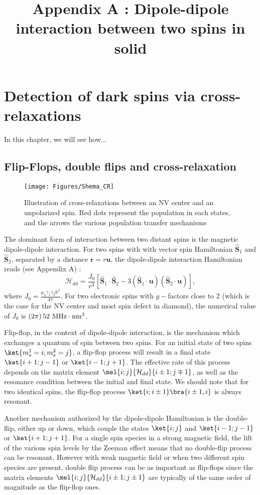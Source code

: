 \documentclass[a4paper]{report}
\title{Appendix A : Dipole-dipole interaction between two spins in solid}
\begin{document}
\chapter{Detection of dark spins via cross-relaxations}
In this chapter, we will see how...
\section{Flip-Flops, double flips and cross-relaxation}

\begin{figure}
\centering
\texttt{[image: Figures/Shema\_CR]}
\caption{Illustration of cross-relaxations between an NV center and an unpolarized spin. Red dots represent the population in each states, and the arrows the various population transfer mechanisms}
\label{CR_shema}
\end{figure}

The dominant form of interaction between two distant spins is the magnetic dipole-dipole interaction. For two spins with with vector spin Hamiltonian $\hat{\mathbf{S}}_1$ and $\hat{\mathbf{S}}_2$, separated by a distance $\mathbf{r}=r\mathbf{u}$, the dipole-dipole interaction Hamiltonian reads (see Appendix A) :
\begin{equation}
\mathcal{H}_{dd}=\frac{J_0}{r^3}\left[ \hat{\mathbf{S}}_1\cdot\hat{\mathbf{S}}_2 - 3 (\hat{\mathbf{S}}_1\cdot\mathbf{u})(\hat{\mathbf{S}}_2\cdot\mathbf{u})\right],
\end{equation}
where $J_0= \frac{\mu_0\gamma_1\gamma_2 \hbar^2}{4\pi}$. For two electronic spins with $g-$factors close to 2 (which is the case for the NV center and most spin defect in diamond), the numerical value of $J_0$ is $(2\pi)\,52\ \rm{MHz}\cdot\rm{nm}^3$.

Flip-flop, in the context of dipole-dipole interaction, is the mechanism which exchanges a quantum of spin between two spins. For an initial state of two spins $\ket{m_s^1=i;m_s^2=j}$, a flip-flop process will result in a final state $\ket{i+1;j-1}$ or $\ket{i-1;j+1}$. The effective rate of this process depends on the matrix element $\mel{i;j}{\mathcal{H}_{dd}}{i\pm 1;j \mp 1}$, as well as the resonance condition between the initial and final state. We should note that for two identical spins, the flip-flop process $\ket{i;i\pm 1}\bra{i\pm 1,i}$ is always resonant.

Another mechanism authorized by the dipole-dipole Hamiltonian is the double-flip, either up or down, which couple the states $\ket{i;j}$ and $\ket{i-1;j-1}$ or $\ket{i+1;j+1}$. For a single spin species in a strong magnetic field, the lift of the various spin levels by the Zeeman effect means that no double-flip process can be resonant. However with weak magnetic field or when two different spin species are present, double flip process can be as important as flip-flops since the matrix elements $\mel{i;j}{\mathcal{H}_{dd}}{i\pm 1;j \pm 1}$ are typically of the same order of magnitude as the flip-flop ones.
\end{document}
